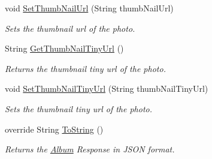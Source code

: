 \begin{DoxyCompactItemize}
void \hyperlink{classcom_1_1shephertz_1_1app42_1_1paas_1_1sdk_1_1csharp_1_1gallery_1_1_album_1_1_photo_a511423c240d3885c820fcbd91583ef7b}{Set\+Thumb\+Nail\+Url} (String thumb\+Nail\+Url)
\begin{DoxyCompactList}\small\item\em Sets the thumbnail url of the photo. \end{DoxyCompactList}\item 
String \hyperlink{classcom_1_1shephertz_1_1app42_1_1paas_1_1sdk_1_1csharp_1_1gallery_1_1_album_1_1_photo_a9c34dd324a9df3acac7b070c503f0881}{Get\+Thumb\+Nail\+Tiny\+Url} ()
\begin{DoxyCompactList}\small\item\em Returns the thumbnail tiny url of the photo. \end{DoxyCompactList}\item 
void \hyperlink{classcom_1_1shephertz_1_1app42_1_1paas_1_1sdk_1_1csharp_1_1gallery_1_1_album_1_1_photo_ac71592daee99b08a282b4506527613a4}{Set\+Thumb\+Nail\+Tiny\+Url} (String thumb\+Nail\+Tiny\+Url)
\begin{DoxyCompactList}\small\item\em Sets the thumbnail tiny url of the photo. \end{DoxyCompactList}\item 
override String \hyperlink{classcom_1_1shephertz_1_1app42_1_1paas_1_1sdk_1_1csharp_1_1gallery_1_1_album_1_1_photo_a86e5ef1e1bf5a982b1ff5fdb2cb8ca6a}{To\+String} ()
\begin{DoxyCompactList}\small\item\em Returns the \hyperlink{classcom_1_1shephertz_1_1app42_1_1paas_1_1sdk_1_1csharp_1_1gallery_1_1_album}{Album} Response in J\+S\+O\+N format. \end{DoxyCompactList}\end{DoxyCompactItemize}
